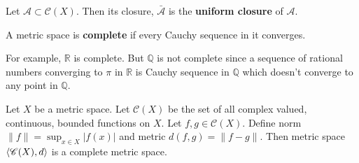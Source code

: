 \begin{definition}
	Let $\mathscr{A} \subset \mathscr{C}(X)$.
	Then its closure, $\bar{\mathscr{A}}$ is the \textbf{uniform closure} of $\mathscr{A}$.
\end{definition}

\begin{definition}
	A metric space is \textbf{complete} if every Cauchy sequence in it converges.
\end{definition}

For example, $\mathbb{R}$ is complete.
But $\mathbb{Q}$ is not complete since a sequence of rational numbers converging to $\pi$ in $\mathbb{R}$ is Cauchy sequence in $\mathbb{Q}$ which doesn't converge to any point in $\mathbb{Q}$.

\begin{theorem} %
	Let $X$ be a metric space.
	Let $\mathscr{C}(X)$ be the set of all complex valued, continuous, bounded functions on $X$.
	Let $f,g \in \mathscr{C}(X)$.
	Define norm $\| f \| = \sup_{x \in X} |f(x)|$ and metric $d(f,g) = \| f-g \|$.
	Then metric space $\left\langle \mathscr{C}(X),d \right\rangle$ is a complete metric space.
\end{theorem}
